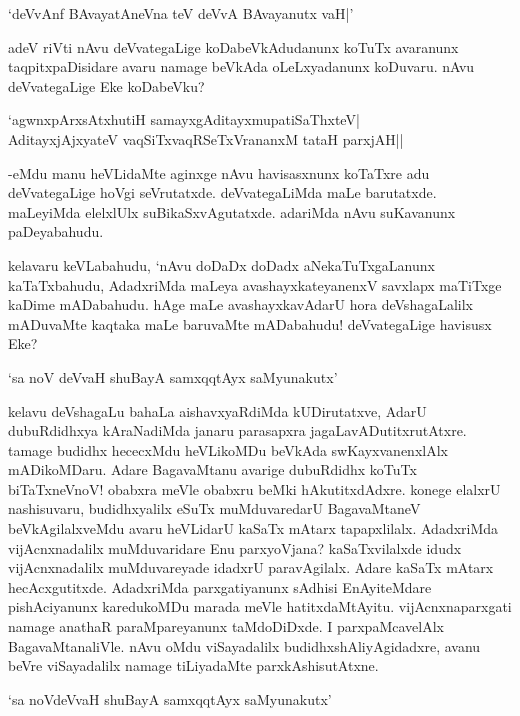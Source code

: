 \begin{shloka}
`deVvAnf BAvayatAneVna teV deVvA BAvayanutx vaH|'
\end{shloka}

adeV riVti nAvu deVvategaLige koDabeVkAdudanunx koTuTx avaranunx taqpitxpaDisidare avaru namage beVkAda oLeLxyadanunx koDuvaru. nAvu deVvategaLige Eke koDabeVku?

\begin{shloka}
`agwnxpArxsAtxhutiH samayxgAditayxmupatiSaThxteV|\\
AditayxjAjxyateV vaqSiTxvaqRSeTxVrananxM tataH parxjAH||
\end{shloka}

-eMdu manu heVLidaMte aginxge nAvu havisasxnunx koTaTxre adu deVvategaLige hoVgi seVrutatxde. deVvategaLiMda maLe barutatxde. maLeyiMda elelxlUlx suBikaSxvAgutatxde. adariMda nAvu suKavanunx paDeyabahudu.

kelavaru keVLabahudu, `nAvu doDaDx doDadx aNekaTuTxgaLanunx kaTaTxbahudu, AdadxriMda maLeya avashayxkateyanenxV savxlapx maTiTxge kaDime mADabahudu. hAge maLe avashayxkavAdarU hora deVshagaLalilx mADuvaMte kaqtaka maLe baruvaMte mADabahudu! deVvategaLige havisusx Eke?

\begin{shloka}
`sa noV deVvaH shuBayA samxqqtAyx saMyunakutx'
\end{shloka}

kelavu deVshagaLu bahaLa aishavxyaRdiMda kUDirutatxve, AdarU dubuRdidhxya kAraNadiMda janaru parasapxra jagaLavADutitxrutAtxre. tamage budidhx hececxMdu heVLikoMDu beVkAda swKayxvanenxlAlx mADikoMDaru. Adare BagavaMtanu avarige dubuRdidhx koTuTx biTaTxneVnoV! obabxra meVle obabxru beMki hAkutitxdAdxre. konege elalxrU nashisuvaru, budidhxyalilx eSuTx muMduvaredarU BagavaMtaneV beVkAgilalxveMdu avaru heVLidarU kaSaTx mAtarx tapapxlilalx. AdadxriMda vijAcnxnadalilx muMduvaridare Enu parxyoVjana? kaSaTxvilalxde idudx vijAcnxnadalilx muMduvareyade idadxrU paravAgilalx. Adare kaSaTx mAtarx hecAcxgutitxde. AdadxriMda parxgatiyanunx sAdhisi EnAyiteMdare pishAciyanunx karedukoMDu marada meVle hatitxdaMtAyitu. vijAcnxnaparxgati namage anathaR paraMpareyanunx taMdoDiDxde. I parxpaMcavelAlx BagavaMtanaliVle. nAvu oMdu viSayadalilx budidhxshAliyAgidadxre, avanu beVre viSayadalilx namage tiLiyadaMte parxkAshisutAtxne.

\begin{shloka}
`sa noVdeVvaH shuBayA samxqqtAyx saMyunakutx'
\end{shloka} 

